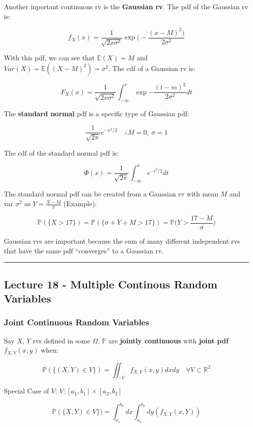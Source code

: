 \documentclass{article}
\begin{document}
Another inportant continuous rv is the \textbf{Gaussian rv}. The pdf
of the Gaussian rv is:

\[
  f_X(x) = \frac{1} {\sqrt{2x\sigma^2}}
  \exp{\bigg(-\frac{(x-M)^2\bigg)} {2\sigma^2}}
\]

With this pdf, we can see that $\mathbb{E}(X) = M$ and $Var(X) =
\mathbb{E}((X-M)^2) = \sigma^2$. The cdf of a Gaussian rv is:

\[
  F_X(x) = \frac{1} {\sqrt{2x\sigma^2}} \int_{-\infty}^x
  \exp{-\frac{(t-m)^2}{2\sigma^2}} dt
\]

The \textbf{standard normal} pdf is a specific type of Gaussian pdf:

\[
  \frac{1}{\sqrt{2\pi}} e^{-x^2/2} \quad \therefore M=0, \ \sigma=1
\]

The cdf of the standard normal pdf is:

\[
  \Phi(x) = \frac{1}{\sqrt{2\pi}} \int_{-\infty}^x e^{-t^2/2} dt
\]

The standard normal pdf can be created from a Gaussian rv with mean
$M$ and var $\sigma^2$ as $Y=\frac{X-M}{\sigma}$ (Example):

\[
  \mathbb{P}(\{X>17\}) = \mathbb{P}(\{\sigma + Y + M > 17\}) =
  \mathbb{P}\Big(Y>\frac{17-M}{\sigma}\Big)
\]

Gaussian rvs are important because the sum of many different
independent rvs that have the same pdf ``converges'' to a Gaussian
rv.


\medskip\hrule
\subsection{Lecture 18 - Multiple Continous Random Variables}

\subsubsection{Joint Continuous Random Variables}

Say $X$, $Y$ rvs defined in some $\Omega$, $\mathbb{P}$ are
\textbf{jointly continuous} with \textbf{joint pdf} $f_{X,Y}(x,y)$
when:

\begin{equation}
  \tag{Jointly Continuous Definition}
  \boxed{
    \mathbb{P}(\{(X,Y)\in V\}) = \iint_{-V} f_{X,Y}(x,y) dx dy \quad
    \forall V \subset \mathbb{R}^2
  }
\end{equation}

Special Case of $V$: $V : [a_1,b_1] \times [a_2,b_2]$

\[
  \mathbb{P}(\{X,Y)\in V\}) = \int_{a_1}^{b_2}dx \int_{a_2}^{b_2}dy
  (f_{X,Y}(x,Y))
\]
\end{document}
